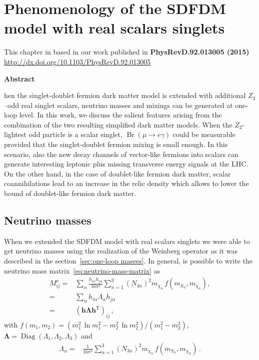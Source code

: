 \chapter{Phenomenology of the SDFDM model with real scalars singlets}

\begin{flushright}
This chapter in based in our work published in \textbf{PhysRevD.92.013005 (2015)}\\ 
\url{http://dx.doi.org/10.1103/PhysRevD.92.013005}
\end{flushright}
\begin{center}
\textbf{Abstract}
\end{center}

  hen the singlet-doublet fermion dark matter model is extended with
  additional $Z_2$--odd real  singlet scalars, neutrino masses and mixings
  can be generated at one-loop level.  In this work, we discuss the salient 
  features arising from the combination of the two resulting
  simplified dark matter models.  When the $Z_2$-lightest odd particle is a
  scalar singlet, $\operatorname{Br}(\mu\to e \gamma)$ could be
  measurable provided that the singlet-doublet fermion mixing is small
  enough. In this scenario, also the new decay channels of vector-like
  fermions into scalars can generate interesting leptonic plus
  missing transverse energy signals at the LHC. On the other hand, in
  the case of doublet-like fermion dark matter, scalar coannihilations
  lead to an increase in the relic density which allows to lower the bound of
  doublet-like fermion dark matter.








\section{Neutrino masses}

When we extended the SDFDM model with real scalars singlets we were able to get neutrino masses using the realization of the Weinberg operator as it was described in the section~\ref{sec:one-loop masees}.  
In general, is possible to write the neutrino mass matrix~\eqref{eq:neutrino-mass-matrix} as
%
\begin{align}
   M^{\nu}_{ij}=&\sum_{\alpha}\frac{h_{i\alpha}h_{j\alpha}}{16\pi^2}\sum_{n=1}^3 \left( N_{3n} \right)^2m_{\chi_n}
\,f\left( m_{S_\alpha},m_{\chi_n} \right) ,\\\label{eq:Mnuij}
=&\sum_{\alpha} h_{i\alpha} \Lambda_{\alpha} h_{j\alpha}\\\label{eq:CI}
=&\left( \mathbf{h}\mathbf{\Lambda}\mathbf{h}^{\operatorname{T}} \right)_{ij}\,,
\end{align}
with
$f \left( m_1,m_2 \right)= (m_1^2\,\ln  m_1^2 -m_2^2\,\ln m_2^2 )/(m_1^2-m_2^2)$, $\boldsymbol{\Lambda}=\operatorname{Diag}\left(\Lambda_1,\Lambda_2,\Lambda_3\right)$ and
\begin{align}
\label{eq:Lambda}
  \Lambda_\alpha=&\frac{1}{16\pi^2}\sum_{n=1}^3 \left( N_{3n} \right)^2m_{\chi_n}\,f\left( m_{S_\alpha},m_{\chi_n} \right)\,.
\end{align}

